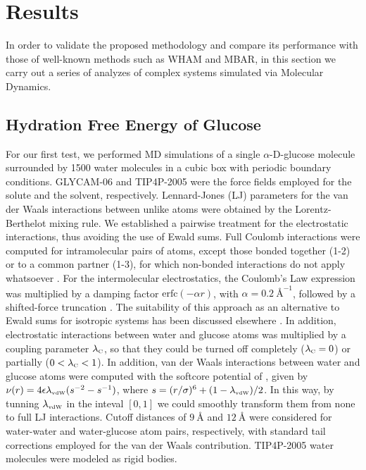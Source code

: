 \documentclass[journal=jctcce,manuscript=article]{achemso}
\begin{document}
\section{Results}

In order to validate the proposed methodology and compare its performance with those of well-known methods such as WHAM and MBAR, in this section we carry out a series of analyzes of complex systems simulated via Molecular Dynamics.

\subsection{Hydration Free Energy of Glucose}
\label{sec:solvation free energy}

For our first test, we performed MD simulations of a single \mbox{$\alpha$-D-glucose} molecule surrounded by 1500 water molecules in a cubic box with periodic boundary conditions. GLYCAM-06 \cite{Kirschner_2007} and TIP4P-2005 \cite{Abascal_2005} were the force fields employed for the solute and the solvent, respectively. Lennard-Jones (LJ) parameters for the van der Waals interactions between unlike atoms were obtained by the Lorentz-Berthelot mixing rule. We established a pairwise treatment for the electrostatic interactions, thus avoiding the use of Ewald sums. Full Coulomb interactions were computed for intramolecular pairs of atoms, except those bonded together (\mbox{1-2}) or to a common partner (\mbox{1-3}), for which non-bonded interactions do not apply whatsoever \cite{Kirschner_2007}. For the intermolecular electrostatics, the Coulomb's Law expression was multiplied by a damping factor $\text{erfc}(-\alpha r)$, with $\alpha = 0.2~\text{\AA}^{-1}$, followed by a shifted-force truncation \cite{Allen_1987}. The suitability of this approach as an alternative to Ewald sums for isotropic systems has been discussed elsewhere \cite{Fennell_2006}. In addition, electrostatic interactions between water and glucose atoms was multiplied by a coupling parameter $\lambda_\text{\tiny C}$, so that they could be turned off completely ($\lambda_\text{\tiny C} = 0$) or partially ($0 < \lambda_\text{\tiny C} < 1$). In addition, van der Waals interactions between water and glucose atoms were computed with the softcore potential of \citeauthor{Beutler_1994} \cite{Beutler_1994}, given by $\nu(r) = 4 \epsilon \lambda_\text{\tiny vdW} (s^{-2} - s^{-1})$, where $s = (r/\sigma)^6 + (1 - \lambda_\text{\tiny vdW})/2$. In this way, by tunning $\lambda_\text{\tiny vdW}$ in the inteval $[0,1]$ we could smoothly transform them from none to full LJ interactions. Cutoff distances of $9~\text{\AA}$ and $12~\text{\AA}$ were considered for water-water and water-glucose atom pairs, respectively, with standard tail corrections employed for the van der Waals contribution. TIP4P-2005 \cite{Abascal_2005} water molecules were modeled as rigid bodies.
\end{document}
